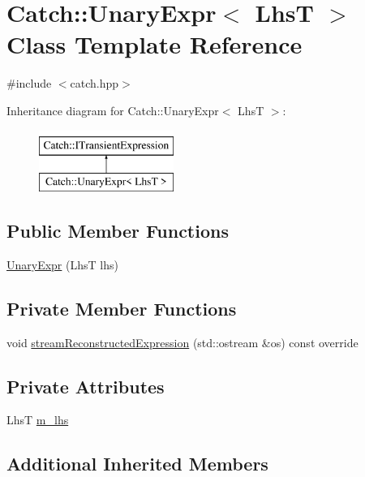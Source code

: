 \hypertarget{class_catch_1_1_unary_expr}{}\section{Catch\+::Unary\+Expr$<$ LhsT $>$ Class Template Reference}
\label{class_catch_1_1_unary_expr}


{\ttfamily \#include $<$catch.\+hpp$>$}

Inheritance diagram for Catch\+::Unary\+Expr$<$ LhsT $>$\+:\begin{figure}[H]
\begin{center}
\leavevmode
\includegraphics[height=2.000000cm]{class_catch_1_1_unary_expr}
\end{center}
\end{figure}
\subsection*{Public Member Functions}
\begin{DoxyCompactItemize}
\item 
\mbox{\hyperlink{class_catch_1_1_unary_expr_ae02f666a1e64da728628aa2033e1d6e7}{Unary\+Expr}} (LhsT lhs)
\end{DoxyCompactItemize}
\subsection*{Private Member Functions}
\begin{DoxyCompactItemize}
\item 
void \mbox{\hyperlink{class_catch_1_1_unary_expr_aaabf30455a996c80675c0f388a6e4110}{stream\+Reconstructed\+Expression}} (std\+::ostream \&os) const override
\end{DoxyCompactItemize}
\subsection*{Private Attributes}
\begin{DoxyCompactItemize}
\item 
LhsT \mbox{\hyperlink{class_catch_1_1_unary_expr_a7b6e97e576377dd60c77ab551a180325}{m\+\_\+lhs}}
\end{DoxyCompactItemize}
\subsection*{Additional Inherited Members}


